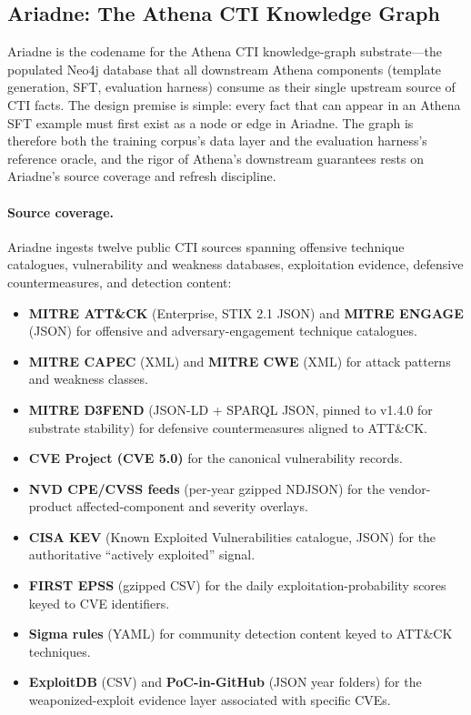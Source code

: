 \documentclass[webpdf,contemporary,large]{oup-authoring-template}
\theoremstyle{thmstyleone}
\theoremstyle{thmstyletwo}
\theoremstyle{thmstylethree}
\begin{document}
\subsection{Ariadne: The Athena CTI Knowledge Graph}
\label{sec:ariadne}

Ariadne is the codename for the Athena CTI knowledge-graph substrate---the populated Neo4j database that all downstream Athena components (template generation, SFT, evaluation harness) consume as their single upstream source of CTI facts. The design premise is simple: every fact that can appear in an Athena SFT example must first exist as a node or edge in Ariadne. The graph is therefore both the training corpus's data layer and the evaluation harness's reference oracle, and the rigor of Athena's downstream guarantees rests on Ariadne's source coverage and refresh discipline.

\paragraph{Source coverage.}
Ariadne ingests twelve public CTI sources spanning offensive technique catalogues, vulnerability and weakness databases, exploitation evidence, defensive countermeasures, and detection content:

\begin{itemize}
  \item \textbf{MITRE ATT\&CK} (Enterprise, STIX 2.1 JSON) and \textbf{MITRE ENGAGE} (JSON) for offensive and adversary-engagement technique catalogues.
  \item \textbf{MITRE CAPEC} (XML) and \textbf{MITRE CWE} (XML) for attack patterns and weakness classes.
  \item \textbf{MITRE D3FEND} (JSON-LD + SPARQL JSON, pinned to v1.4.0 for substrate stability) for defensive countermeasures aligned to ATT\&CK.
  \item \textbf{CVE Project (CVE 5.0)} for the canonical vulnerability records.
  \item \textbf{NVD CPE/CVSS feeds} (per-year gzipped NDJSON) for the vendor-product affected-component and severity overlays.
  \item \textbf{CISA KEV} (Known Exploited Vulnerabilities catalogue, JSON) for the authoritative ``actively exploited'' signal.
  \item \textbf{FIRST EPSS} (gzipped CSV) for the daily exploitation-probability scores keyed to CVE identifiers.
  \item \textbf{Sigma rules} (YAML) for community detection content keyed to ATT\&CK techniques.
  \item \textbf{ExploitDB} (CSV) and \textbf{PoC-in-GitHub} (JSON year folders) for the weaponized-exploit evidence layer associated with specific CVEs.
\end{itemize}
\end{document}
